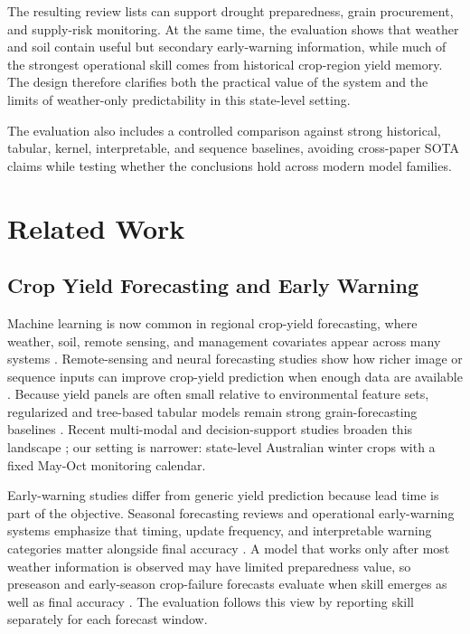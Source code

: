 \documentclass[wcp]{jmlr}
\begin{document}
The resulting review lists can support drought preparedness, grain procurement, and supply-risk monitoring. At the same time, the evaluation shows that weather and soil contain useful but secondary early-warning information, while much of the strongest operational skill comes from historical crop-region yield memory. The design therefore clarifies both the practical value of the system and the limits of weather-only predictability in this state-level setting.

The evaluation also includes a controlled comparison against strong historical, tabular, kernel, interpretable, and sequence baselines, avoiding cross-paper SOTA claims while testing whether the conclusions hold across modern model families.

\section{Related Work}

\subsection{Crop Yield Forecasting and Early Warning}

Machine learning is now common in regional crop-yield forecasting, where weather, soil, remote sensing, and management covariates appear across many systems \citep{vanKlompenburg2020systematicReview,paudel2021largeScaleYield}. Remote-sensing and neural forecasting studies show how richer image or sequence inputs can improve crop-yield prediction when enough data are available \citep{you2017deepGaussian,khaki2019dnn,khaki2020cnnRnn}. Because yield panels are often small relative to environmental feature sets, regularized and tree-based tabular models remain strong grain-forecasting baselines \citep{meroni2021smallData}. Recent multi-modal and decision-support studies broaden this landscape \citep{lin2024cropnet,declercq2024indiaRice}; our setting is narrower: state-level Australian winter crops with a fixed May-Oct monitoring calendar.

Early-warning studies differ from generic yield prediction because lead time is part of the objective. Seasonal forecasting reviews and operational early-warning systems emphasize that timing, update frequency, and interpretable warning categories matter alongside final accuracy \citep{basso2019seasonalForecast,rembold2019asap}. A model that works only after most weather information is observed may have limited preparedness value, so preseason and early-season crop-failure forecasts evaluate when skill emerges as well as final accuracy \citep{anderson2024preseasonWarning}. The evaluation follows this view by reporting skill separately for each forecast window.
\end{document}
